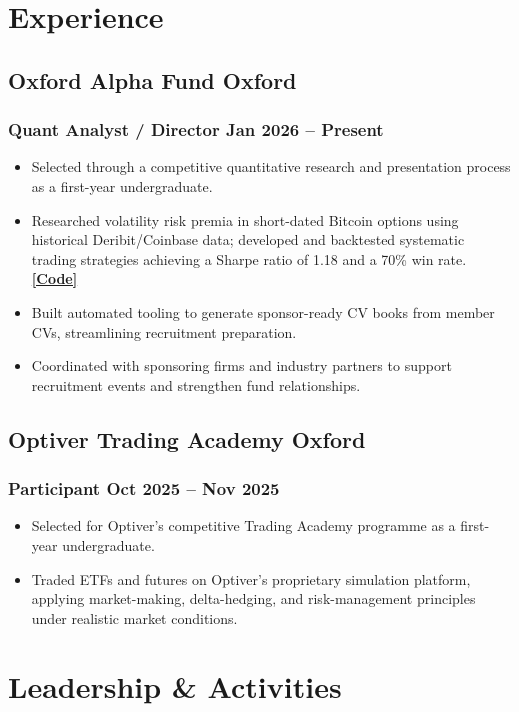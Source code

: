 \documentclass[9pt]{article} %
\begin{document}
\section{Experience}

\subsection{Oxford Alpha Fund \hfill Oxford}
\subsubsection{Quant Analyst / Director \hfill Jan 2026 -- Present}
\begin{itemize}
    \item Selected through a competitive quantitative research and presentation process as a first-year undergraduate.
    \item Researched volatility risk premia in short-dated Bitcoin options using historical Deribit/Coinbase data; developed and backtested systematic trading strategies achieving a Sharpe ratio of 1.18 and a 70\% win rate. {\small\href{https://github.com/Harik-S/oaf-hilary-2026}{\textbf{[Code]}}}
    \item Built automated tooling to generate sponsor-ready CV books from member CVs, streamlining recruitment preparation.
    \item Coordinated with sponsoring firms and industry partners to support recruitment events and strengthen fund relationships.
\end{itemize}

\subsection{Optiver Trading Academy \hfill Oxford}
\subsubsection{Participant \hfill Oct 2025 -- Nov 2025}
\begin{itemize}
    \item Selected for Optiver's competitive Trading Academy programme as a first-year undergraduate.
    \item Traded ETFs and futures on Optiver's proprietary simulation platform, applying market-making, delta-hedging, and risk-management principles under realistic market conditions.
\end{itemize}

\section{Leadership \& Activities}
\end{document}
